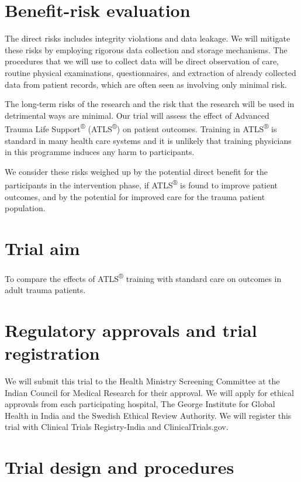 \documentclass[
]{scrartcl}
\begin{document}
\section{Benefit-risk evaluation}\label{benefit-risk-evaluation}

The direct risks includes integrity violations and data leakage. We will
mitigate these risks by employing rigorous data collection and storage
mechanisms. The procedures that we will use to collect data will be
direct observation of care, routine physical examinations,
questionnaires, and extraction of already collected data from patient
records, which are often seen as involving only minimal risk.

The long-term risks of the research and the risk that the research will
be used in detrimental ways are minimal. Our trial will assess the
effect of Advanced Trauma Life Support\textsuperscript{®}
(ATLS\textsuperscript{®}) on patient outcomes. Training in
ATLS\textsuperscript{®} is standard in many health care systems and it
is unlikely that training physicians in this programme induces any harm
to participants.

We consider these risks weighed up by the potential direct benefit for
the participants in the intervention phase, if ATLS\textsuperscript{®}
is found to improve patient outcomes, and by the potential for improved
care for the trauma patient population.

\section{Trial aim}\label{trial-aim}

To compare the effects of ATLS\textsuperscript{®} training with standard
care on outcomes in adult trauma patients.

\section{Regulatory approvals and trial
registration}\label{regulatory-approvals-and-trial-registration}

We will submit this trial to the Health Ministry Screening Committee at
the Indian Council for Medical Research for their approval. We will
apply for ethical approvals from each participating hospital, The George
Institute for Global Health in India and the Swedish Ethical Review
Authority. We will register this trial with Clinical Trials
Registry-India and ClinicalTrials.gov.

\section{Trial design and procedures}\label{trial-design-and-procedures}
\end{document}
